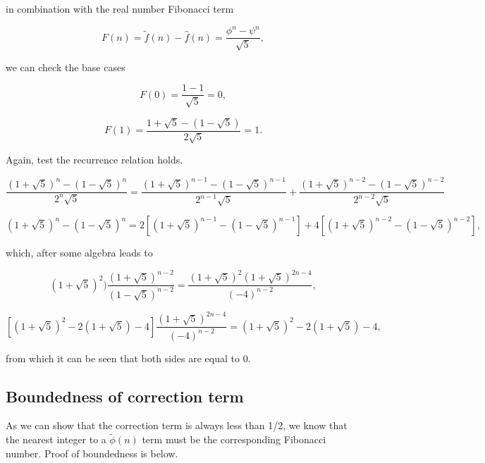 \documentclass{article}
\begin{document}
in combination with the real number Fibonacci term

\begin{equation}
  F(n) = \tilde{f}(n) - \hat{f}(n) = \frac{\phi^n - \psi^n}{\sqrt{5}},
\end{equation}

we can check the base cases

\begin{equation}
  F(0) = \frac{1 - 1}{\sqrt{5}} = 0,
\end{equation}

\begin{equation}
  F(1) = \frac{1 + \sqrt{5} - (1 - \sqrt{5})}{2 \sqrt{5}} = 1.
\end{equation}

Again, test the recurrence relation holds.

\begin{equation}
  \frac{(1 + \sqrt{5})^{n} - (1 - \sqrt{5})^{n}}{2^n \sqrt{5}} = \frac{(1 + \sqrt{5})^{n-1} - (1 - \sqrt{5})^{n-1}}{2^{n-1} \sqrt{5}} + \frac{(1 + \sqrt{5})^{n-2} - (1 - \sqrt{5})^{n-2}}{2^{n-2} \sqrt{5}} 
\end{equation}

\begin{equation}
  (1 + \sqrt{5})^{n} - (1 - \sqrt{5})^{n} = 2 \left[ (1 + \sqrt{5})^{n-1} - (1 - \sqrt{5})^{n-1} \right] + 4 \left[ (1 + \sqrt{5})^{n-2} - (1 - \sqrt{5})^{n-2} \right],
\end{equation}

which, after some algebra leads to

\begin{equation}
  (1 + \sqrt{5})^{2}) \frac{(1 + \sqrt{5})^{n-2}}{(1 - \sqrt{5})^{n-2}} = \frac{(1 + \sqrt{5})^{2} (1 + \sqrt{5})^{2n-4}}{(-4)^{n-2}},
\end{equation}

\begin{equation}
  \left[ (1 + \sqrt{5})^{2} - 2(1 + \sqrt{5}) - 4 \right] \frac{(1 + \sqrt{5})^{2n-4}}{(-4)^{n-2}} = (1 + \sqrt{5})^{2} - 2(1 + \sqrt{5}) - 4,
\end{equation}

from which it can be seen that both sides are equal to 0.

\subsection*{Boundedness of correction term}

As we can show that the correction term is always less than 1/2, we know that the nearest integer to a $\tilde{\phi}(n)$ term must be the corresponding Fibonacci number. Proof of boundedness is below.
\end{document}
